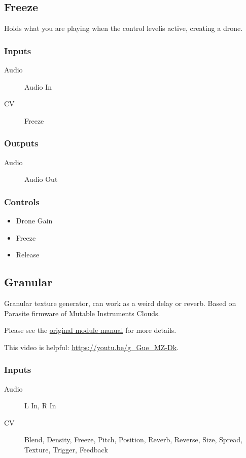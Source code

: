 \subsection{Freeze}

Holds what you are playing when the control levelis active, creating a drone.



\subsubsection{Inputs}
\begin{description}
\item [Audio] Audio In
\item [CV] Freeze
\end{description}

\subsubsection{Outputs}
\begin{description}
\item [Audio] Audio Out
\end{description}

\subsubsection{Controls}
\begin{itemize}
\item Drone Gain
\item Freeze
\item Release
\end{itemize}

\subsection{Granular}

Granular texture generator, can work as a weird delay or reverb. Based on Parasite firmware of Mutable Instruments Clouds.



Please see the \href{https://www.mutable-instruments.net/modules/clouds/manual/}{original module manual} for more details.

This video is helpful: \url{https://youtu.be/g_Gue_MZ-Dk}.

\subsubsection{Inputs}
\begin{description}
\item [Audio] L In, R In
\item [CV] Blend, Density, Freeze, Pitch, Position, Reverb, Reverse, Size, Spread, Texture, Trigger, Feedback
\end{description}

